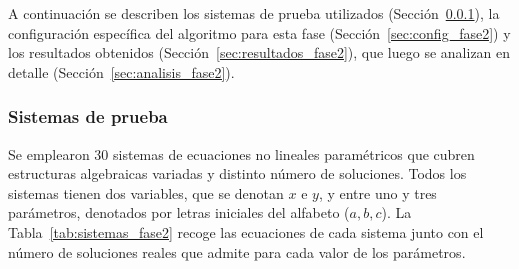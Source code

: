 \documentclass{article} \usepackage[utf8]{inputenc} \usepackage[spanish]{babel} \usepackage{amsmath, amssymb, amsthm} \usepackage{bm} \usepackage{float} \usepackage{longtable} \usepackage[hidelinks]{hyperref} \spanishdecimal{.}
\begin{document}
A continuación se describen los sistemas de prueba utilizados (Sección~\ref{sec:sistemas_prueba_fase2}), la configuración específica del algoritmo para esta fase (Sección~\ref{sec:config_fase2}) y los resultados obtenidos (Sección~\ref{sec:resultados_fase2}), que luego se analizan en detalle (Sección~\ref{sec:analisis_fase2}).

\subsubsection{Sistemas de prueba} \label{sec:sistemas_prueba_fase2}

Se emplearon 30 sistemas de ecuaciones no lineales paramétricos que cubren estructuras algebraicas variadas y distinto número de soluciones.  Todos los sistemas tienen dos variables, que se denotan \(x\) e \(y\), y entre uno y tres parámetros, denotados por letras iniciales del alfabeto (\(a, b, c\)).  La Tabla~\ref{tab:sistemas_fase2} recoge las ecuaciones de cada sistema junto con el número de soluciones reales que admite para cada valor de los parámetros.
\end{document}
